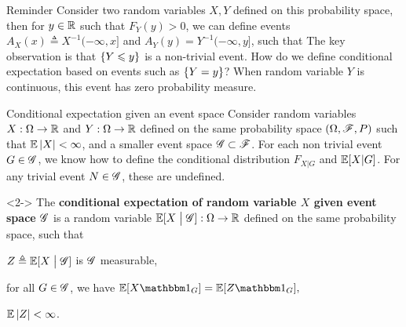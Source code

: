 \documentclass[12pt,aspectratio=169]{beamer}
\begin{document}
\begin{frame}
\begin{block}{Reminder}
Consider two random variables $X,Y$ defined on this probability space, 
then for $y \in \mathbb{R}$ such that $F_Y(y) > 0$, we can define events $A_X(x) \triangleq X^{-1}(-\infty, x]$ and $A_Y(y) = Y^{-1}(-\infty, y]$, 
such that 
The key observation is that $\left\{Y \leqslant y\right\}$ is a non-trivial event. 
How do we define conditional expectation based on events such as $\left\{Y = y\right\}$? 
When random variable $Y$ is continuous, this event has zero probability measure. 
\end{block}
\end{frame}
\begin{frame}{Conditional expectation given an event space}
Consider random variables $X:\Omega\to\mathbb{R}$ and $Y:\Omega\to\mathbb{R}$ defined on the same probability space $(\Omega, \mathscr{F}, P)$ 
such that $\mathbb{E}\left\lvert X\right\rvert < \infty$, and a smaller event space $\mathscr{G} \subset \mathscr{F}$. 
For each non trivial event $G \in \mathscr{G}$, we know how to define the conditional distribution $F_{X|G}$ and $\mathbb{E}[X|G]$. 
For any trivial event $N \in \mathscr{G}$, these are undefined. 

\begin{Definition}<2->%
The \textbf{conditional expectation of random variable $X$ given event space $\mathscr{G}$} is a random variable $\mathbb{E}[X\; \big\vert \; \mathscr{G}]: \Omega \to \mathbb{R}$ defined on the same probability space, 
such that 
\begin{compactenum}[(i)]
\item $Z \triangleq \mathbb{E}[X\; \big\vert \; \mathscr{G}]$ is $\mathscr{G}$ measurable, %
\item for all $G\in \mathscr{G}$, we have
$
\E[X\Ind{G}] = \E[Z\Ind{G}], %
$
\item $\mathbb{E}\left\lvert Z\right\rvert<\infty$.
\end{compactenum}
\end{Definition}
\end{frame}
\end{document}
